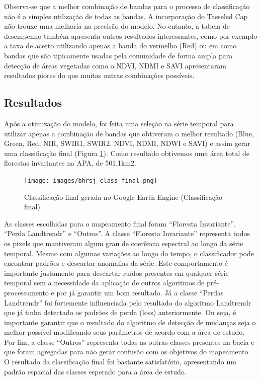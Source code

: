 \documentclass[12pt,a4paper]{article}
\begin{document}
Observa-se que a melhor combinação de bandas para o processo de classificação não é a simples utilização de todas as bandas. A incorporação do Tasseled Cap não trouxe uma melhoria na precisão do modelo. No entanto, a tabela de desempenho também apresenta outros resultados interessantes, como por exemplo a taxa de acerto utilizando apenas a banda do vermelho (Red) ou em como bandas que são tipicamente usadas pela comunidade de forma ampla para detecção de áreas vegetadas como o NDVI, NDMI e SAVI apresentaram resultados piores do que muitas outras combinações possíveis. 

\subsection{Resultados}

Após a otimização do modelo, foi feita uma seleção na série temporal para utilizar apenas a combinação de bandas que obtiveram o melhor resultado (Blue, Green, Red, NIR, SWIR1, SWIR2, NDVI, NDMI, NDWI e SAVI) e assim gerar uma classificação final (Figura \ref{fig:bhrsj_class_final}). Como resultado obtivemos uma área total de florestas invariantes na APA, de 501,1km2.

\begin{figure}[h!]
    \centering
    \texttt{[image: images/bhrsj\_class\_final.png]}
    \caption{Classificação final gerada no Google Earth Engine (Classificação final)}
    \label{fig:bhrsj_class_final}
\end{figure}

\newpage

As classes escolhidas para o mapeamento final foram “Floresta Invariante”, “Perda Landtrendr” e “Outros”. A classe “Floresta Invariante” representa todos os pixels que mantiveram algum grau de coerência espectral ao longo da série temporal. Mesmo com algumas variações ao longo do tempo, o classificador pode encontrar padrões e descartar anomalias da série. Este comportamento é importante justamente para descartar ruídos presentes em qualquer série temporal sem a necessidade da aplicação de outros algoritmos de pré-processamento e por já garantir um bom resultado. Já a classe “Perdas Landtrendr” foi fortemente influenciada pelo resultado do algoritmo Landtrendr que já tinha detectado os padrões de perda (loss) anteriormente. Ou seja, é importante garantir que o resultado do algoritmo de detecção de mudanças seja o melhor possível modificando seus parâmetros de acordo com a área de estudo. Por fim, a classe “Outros” representa todas as outras classes presentes na bacia e que foram agregadas para não gerar confusão com os objetivos do mapeamento. O resultado da classificação final foi bastante satisfatório, apresentando um padrão espacial das classes esperado para a área de estudo.
\end{document}
